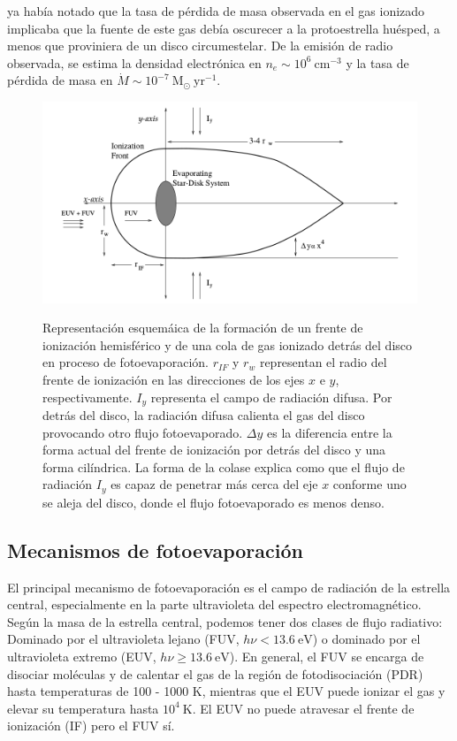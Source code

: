 \citet{churchwell:1987} ya había notado que la tasa de pérdida de masa observada
en el gas ionizado implicaba que la fuente de este gas debía oscurecer a la
protoestrella huésped, a menos que proviniera de un disco circumestelar. De la
emisión de radio observada, se estima la densidad electrónica en
$n_e \sim 10^6~\mathrm{cm^{-3}}$ y la tasa de pérdida de masa en
$\dot{M} \sim 10^{-7}~\mathrm{M_\odot~yr^{-1}}$.

\begin{figure}
  \includegraphics[width=0.8\linewidth]{./Figures/Johnstone-shape}
  \label{fig:prop-shape}
  \caption{Representación esquemáica de la formación de un frente de ionización
    hemisférico y de una cola de gas ionizado detrás del disco en proceso de
    fotoevaporación. $r_{IF}$ y $r_w$ representan el radio del frente de ionización
    en las direcciones de los ejes $x$ e $y$, respectivamente. $I_y$ representa el
    campo de radiación difusa. Por detrás del disco, la radiación difusa calienta el
    gas del disco provocando otro flujo fotoevaporado. $\Delta y$ es la diferencia
    entre la forma actual del frente de ionización por detrás del disco y una forma
    cilíndrica. La forma de la colase explica como que el flujo de radiación $I_y$
    es capaz de penetrar más cerca del eje $x$ conforme uno se aleja del disco, donde
    el flujo fotoevaporado es menos denso.}
\end{figure}


\subsection{Mecanismos de fotoevaporación \citep{Johnstone:1998}}

El principal mecanismo de fotoevaporación es el campo de radiación de la
estrella central, especialmente en la parte ultravioleta del espectro
electromagnético. Según la masa de la estrella central, podemos tener dos
clases de flujo radiativo: Dominado por el ultravioleta lejano (FUV,
$h\nu < 13.6~\mathrm{eV}$) o dominado por el ultravioleta extremo (EUV,
$h\nu \geq 13.6~\mathrm{eV}$). En general, el FUV se encarga de disociar moléculas
y de calentar el gas de la región de fotodisociación (PDR) hasta
temperaturas de 100 - 1000 K, mientras que el EUV puede ionizar el gas y
elevar su temperatura hasta $10^4~\mathrm{K}$. El EUV no puede atravesar el frente
de ionización (IF) pero el FUV sí.

